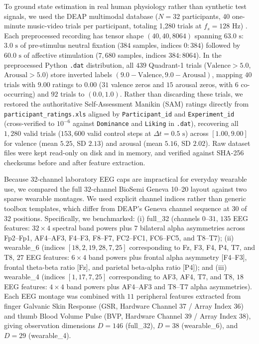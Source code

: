 \documentclass[a4paper,fleqn]{cas-dc}
\begin{document}
To ground state estimation in real human physiology rather than synthetic test signals, we used the DEAP multimodal database ($N = 32$ participants, 40 one-minute music-video trials per participant, totaling 1,280 trials at $f_s = 128\text{ Hz}$) \cite{koelstra2012deap}. Each preprocessed recording has tensor shape $(40, 40, 8064)$ spanning $63.0\text{ s}$: $3.0\text{ s}$ of pre-stimulus neutral fixation ($384$ samples, indices $0{:}384$) followed by $60.0\text{ s}$ of affective stimulation ($7,680$ samples, indices $384{:}8064$). In the preprocessed Python \texttt{.dat} distribution, all $439$ Quadrant-1 trials ($\text{Valence} > 5.0$, $\text{Arousal} > 5.0$) store inverted labels $(9.0 - \text{Valence}, 9.0 - \text{Arousal})$, mapping $40$ trials with $9.00$ ratings to $0.00$ ($31$ valence zeros and $15$ arousal zeros, with $6$ co-occurring) and $92$ trials to $(0.0, 1.0)$. Rather than discarding these trials, we restored the authoritative Self-Assessment Manikin (SAM) ratings directly from \texttt{participant\_ratings.xls} aligned by \texttt{Participant\_id} and \texttt{Experiment\_id} (cross-verified to $10^{-6}$ against \texttt{Dominance} and \texttt{Liking} in \texttt{.dat}), recovering all $1,280$ valid trials ($153,600$ valid control steps at $\Delta t = 0.5\text{ s}$) across $[1.00, 9.00]$ for valence (mean $5.25$, SD $2.13$) and arousal (mean $5.16$, SD $2.02$). Raw dataset files were kept read-only on disk and in memory, and verified against SHA-256 checksums before and after feature extraction.

Because 32-channel laboratory EEG caps are impractical for everyday wearable use, we compared the full $32$-channel BioSemi Geneva 10--20 layout against two sparse wearable montages. We used explicit channel indices rather than generic toolbox templates, which differ from DEAP's Geneva channel sequence at 30 of 32 positions. Specifically, we benchmarked: (i) full\_32 (channels $0\text{--}31$, $135$ EEG features: $32 \times 4$ spectral band powers plus $7$ bilateral alpha asymmetries across Fp2--Fp1, AF4--AF3, F4--F3, F8--F7, FC2--FC1, FC6--FC5, and T8--T7); (ii) wearable\_6 (indices $[18, 2, 19, 28, 7, 25]$ corresponding to Fz, F3, F4, P4, T7, and T8, $27$ EEG features: $6 \times 4$ band powers plus frontal alpha asymmetry [F4--F3], frontal theta-beta ratio [Fz], and parietal beta-alpha ratio [P4]); and (iii) wearable\_4 (indices $[1, 17, 7, 25]$ corresponding to AF3, AF4, T7, and T8, $18$ EEG features: $4 \times 4$ band powers plus AF4--AF3 and T8--T7 alpha asymmetries). Each EEG montage was combined with $11$ peripheral features extracted from finger Galvanic Skin Response (GSR, Hardware Channel 37 / Array Index 36) and thumb Blood Volume Pulse (BVP, Hardware Channel 39 / Array Index 38), giving observation dimensions $D = 146$ (full\_32), $D = 38$ (wearable\_6), and $D = 29$ (wearable\_4).
\end{document}
